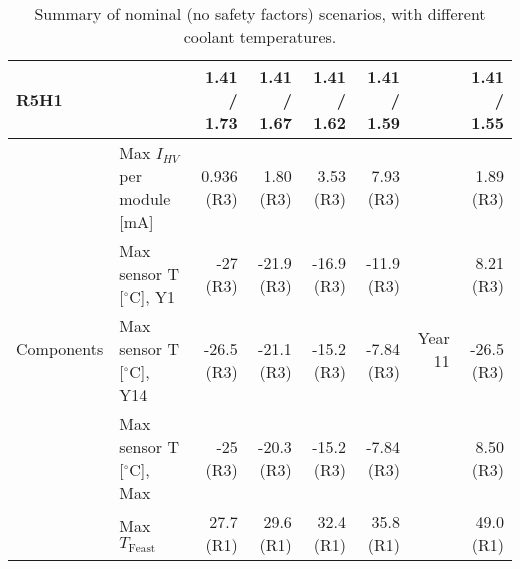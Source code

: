 \begin{table}[ht]
\begin{centering}
{\begin{tabular}{|l|l|r|r|r|r|r|r|}
R5H1                            &                                              &   1.41 / 1.73 &   1.41 / 1.67 &   1.41 / 1.62 &   1.41 / 1.59 &  &   1.41 / 1.55 \\ \hline
\multirow{5}{*}{Components}     & Max $I_{HV}$ per module [mA]                 &    0.936 (R3) &     1.80 (R3) &     3.53 (R3) &     7.93 (R3) & \multirow{5}{*}{Year 11} &     1.89 (R3) \\ 
                                & Max sensor T [$^\circ$C], Y1                 &      -27 (R3) &    -21.9 (R3) &    -16.9 (R3) &    -11.9 (R3) &  &     8.21 (R3) \\ 
                                & Max sensor T [$^\circ$C], Y14                &    -26.5 (R3) &    -21.1 (R3) &    -15.2 (R3) &    -7.84 (R3) &  &    -26.5 (R3) \\ 
                                & Max sensor T [$^\circ$C], Max                &      -25 (R3) &    -20.3 (R3) &    -15.2 (R3) &    -7.84 (R3) &  &     8.50 (R3) \\ 
                                & Max $T_\text{Feast}$                         &     27.7 (R1) &     29.6 (R1) &     32.4 (R1) &     35.8 (R1) &  &     49.0 (R1) \\ 
\hline\end{tabular}
} %
\caption*{Summary of nominal (no safety factors) scenarios, with different coolant temperatures.}
\end{centering}
\end{table}

